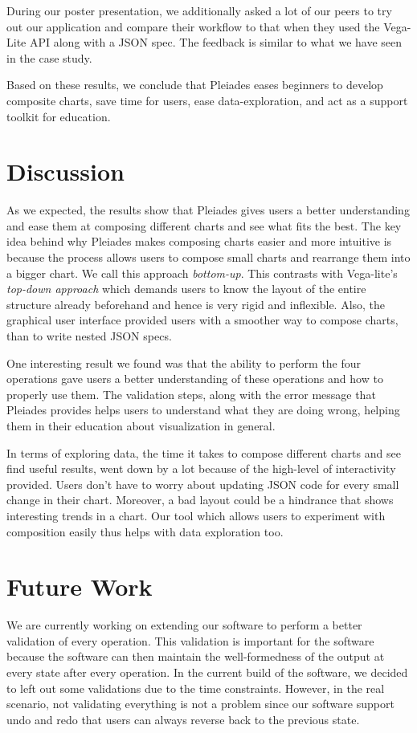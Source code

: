 \documentclass[journal]{vgtc}                %
\begin{document}
During our poster presentation, we additionally asked a lot of our peers
to try out our application and compare their workflow to that when they used the
Vega-Lite API along with a JSON spec. The feedback is similar to what we have
seen in the case study.

Based on these results, we conclude that Pleiades eases beginners to
develop composite charts, save time for users, ease data-exploration,
and act as a support toolkit for education.

\section{Discussion}

As we expected, the results show that Pleiades gives users a better understanding
and ease them at composing different charts and see what fits the best.
The key idea behind why Pleiades makes composing charts
easier and more intuitive is because the process allows users to compose small
charts and rearrange them into a bigger chart. We call this approach
\emph{bottom-up}. This contrasts with Vega-lite's \emph{top-down approach}
which demands users to know the layout of the entire structure already
beforehand and hence is very rigid and inflexible. Also, the graphical user interface
provided users with a smoother way to compose charts, than to write nested JSON specs.

One interesting result we found was that the ability to perform
the four operations gave users a better understanding of these operations
and how to properly use them. The validation steps, along with the error message
that Pleiades provides helps users to understand what they are doing wrong,
helping them in their education about visualization in general.

In terms of exploring data, the time it takes to compose different
charts and see find useful results, went down by a lot because of the
high-level of interactivity provided. Users don’t have to worry about
updating JSON code for every small change in their chart. Moreover,
a bad layout could be a hindrance that shows interesting trends in a chart.
Our tool which allows users to experiment with composition easily thus helps
with data exploration too.

\section{Future Work}
We are currently working on extending our software to perform a better validation
of every operation. This validation is important for the software because the
software can then maintain the well-formedness of the output at every state after
every operation. In the current build of the software, we decided to left out some
validations due to the time constraints. However, in the real scenario, not validating
everything is not a problem since our software support undo and redo that users
can always reverse back to the previous state.
\end{document}
